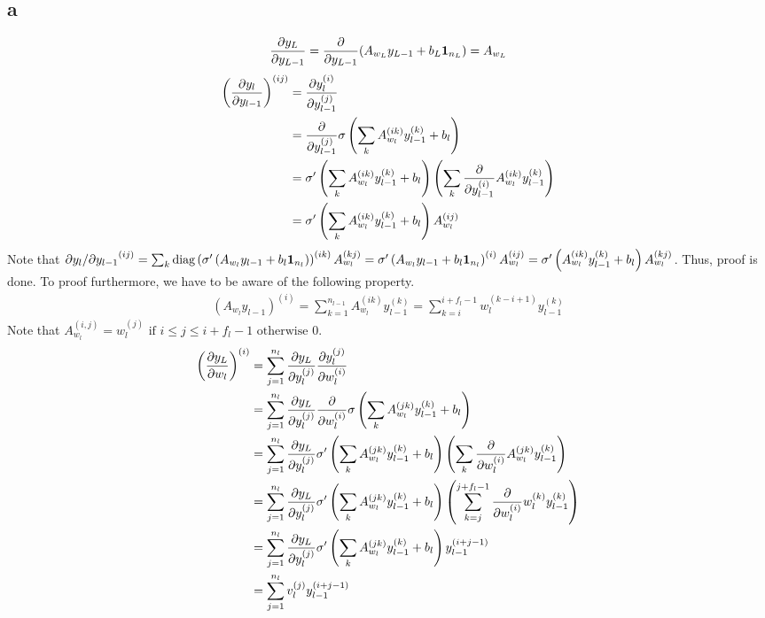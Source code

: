\documentclass[10pt]{article}
\begin{document}
\subsection*{a}
\begin{align*}
    &{\partial y_L \over \partial y_{L-1}} = {\partial \over \partial y_{L-1}} (A_{w_L}y_{L-1} + b_L\mathbf{1}_{n_L}) = A_{w_L}\\
\end{align*}
\begin{align*}
    \left({\partial y_l \over \partial y_{l-1}}\right)^{(ij)} &= {\partial y_l^{(i)} \over \partial y_{l-1}^{(j)}} \\ 
    &= {\partial \over \partial y_{l-1}^{(j)}}\sigma\left(\sum_k A_{w_l}^{(ik)}y_{l-1}^{(k)} + b_l\right) \\ 
    &= \sigma^\prime\left(\sum_k A_{w_l}^{(ik)}y_{l-1}^{(k)} + b_l\right)\left(\sum_k {\partial \over \partial y_{l-1}^{(i)}} A_{w_l}^{(ik)} y_{l-1}^{(k)}\right) \\
    &= \sigma^\prime\left(\sum_k A_{w_l}^{(ik)}y_{l-1}^{(k)} + b_l\right) A_{w_l}^{(ij)}
\end{align*}
Note that ${\partial y_l /\partial y_{l-1}}^{(ij)} = \sum_k \text{diag}\left(\sigma^\prime\left(A_{w_l}y_{l-1} + b_l\mathbf{1}_{n_l}\right)\right)^{(ik)}A_{w_l}^{(kj)} = \sigma^\prime\left(A_{w_l}y_{l-1} + b_l\mathbf{1}_{n_l}\right)^{(i)}A_{w_l}^{(ij)} \\ = \sigma^\prime\left(A_{w_l}^{(ik)}y_{l-1}^{(k)} + b_l\right)A_{w_l}^{(kj)}$.
Thus, proof is done. To proof furthermore, we have to be aware of the following property.
\begin{align*}
    (A_{w_l}y_{l-1})^{(i)} = \sum_{k=1}^{n_{l-1}} A_{w_l}^{(ik)}y_{l-1}^{(k)} = \sum_{k=i}^{i+f_l-1}w_l^{(k-i+1)}y_{l-1}^{(k)}
\end{align*}
Note that $A_{w_l}^{(i,j)} = w_l^{(j)} \text{ if } i\le j \le i+f_l-1 \text{ otherwise }0$.
\begin{align*}
    \left({\partial y_L \over \partial w_l}\right)^{(i)} &= \sum_{j=1}^{n_l} {\partial y_L\over \partial y_{l}^{(j)}}{\partial y_l^{(j)}\over \partial w_l^{(i)}}\\
    &= \sum_{j=1}^{n_l}{\partial y_L\over \partial y_{l}^{(j)}}{\partial \over \partial w_l^{(i)}}\sigma\left(\sum_k A_{w_l}^{(jk)}y_{l-1}^{(k)} + b_l\right) \\
    &= \sum_{j=1}^{n_l}{\partial y_L\over \partial y_{l}^{(j)}}\sigma^\prime\left(\sum_k A_{w_l}^{(jk)}y_{l-1}^{(k)} + b_l\right)\left(\sum_k {\partial \over \partial w_l^{(i)}} A_{w_l}^{(jk)}y_{l-1}^{(k)}\right) \\
    &= \sum_{j=1}^{n_l}{\partial y_L\over \partial y_{l}^{(j)}}\sigma^\prime\left(\sum_k A_{w_l}^{(jk)}y_{l-1}^{(k)} + b_l\right)\left(\sum_{k=j}^{j+f_l-1} {\partial \over \partial w_l^{(i)}} w_l^{(k)}y_{l-1}^{(k)}\right) \\
    &= \sum_{j=1}^{n_l}{\partial y_L\over \partial y_{l}^{(j)}}\sigma^\prime\left(\sum_k A_{w_l}^{(jk)}y_{l-1}^{(k)} + b_l\right) y_{l-1}^{(i+j-1)} \\
    &= \sum_{j=1}^{n_l}v_l^{(j)}y_{l-1}^{(i+j-1)}
\end{align*}
\end{document}
